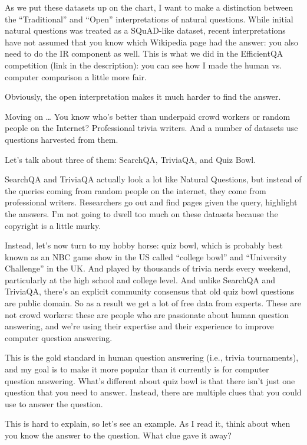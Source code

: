 As we put these datasets up on the chart, I want to make a distinction between the “Traditional” and “Open” interpretations of natural questions.  While initial natural questions was treated as a SQuAD-like dataset, recent interpretations have not assumed that you know which Wikipedia page had the answer: you also need to do the IR component as well.  This is what we did in the EfficientQA competition (link in the description): you can see how I made the human vs. computer comparison a little more fair.

Obviously, the open interpretation makes it much harder to find the answer.


Moving on … You know who’s better than underpaid crowd workers or random people on the Internet?  Professional trivia writers.  And a number of datasets use questions harvested from them.

Let’s talk about three of them: SearchQA, TriviaQA, and Quiz Bowl.

SearchQA and TriviaQA actually look a lot like Natural Questions, but instead of the queries coming from random people on the internet, they come from professional writers.  Researchers go out and find pages given the query, highlight the answers.  I’m not going to dwell too much on these datasets because the copyright is a little murky.

Instead, let's now turn to my hobby horse: quiz bowl, which is probably best known as an NBC game show in the US called “college bowl” and “University Challenge” in the UK.  And played by thousands of trivia nerds every weekend, particularly at the high school and college level.  And unlike SearchQA and TriviaQA, there’s an explicit community consensus that old quiz bowl questions are public domain.  So as a result we get a lot of free data from experts. These are not crowd workers: these are people who are passionate about human question answering, and we're using their expertise and their experience to improve computer question answering.

This is the gold standard in human question answering (i.e., trivia tournaments), and my goal is to make it more popular than it currently is for computer question answering.  What’s different about quiz bowl is that there isn’t just one question that you need to answer.  Instead, there are multiple clues that you could use to answer the question.  

This is hard to explain, so let’s see an example.  As I read it, think about when you know the answer to the question.  What clue gave it away?

